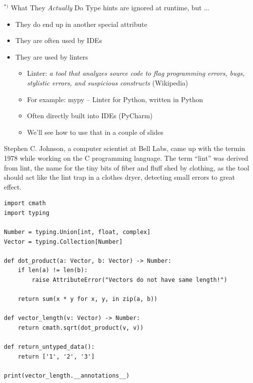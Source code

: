 \begin{frame}[fragile]{$^{*)}$ What They \emph{Actually} Do}
%
\vspace{-3pt}
Type hints are ignored at runtime, but ...
\begin{itemize}
\item They do end up in another special attribute 
\item They are often used by IDEs
\item They are used by linters
	\begin{itemize}
	\item Linter: \emph{a tool that analyzes source code to flag programming errors, bugs, stylistic errors, and suspicious constructs} (Wikipedia)
	\item For example: mypy -- Linter for Python, written in Python
	\item Often directly built into IDEs (\zB PyCharm)
	\item We'll see how to use that in a couple of slides
	\end{itemize}
\end{itemize}
%
\vspace{-3pt}
\begin{hintbox}
\footnotesize
Stephen C. Johnson, a computer scientist at Bell Labs, came up with the termin 1978 while working on the C programming language. The term \enquote{lint} was derived from lint, the name for the tiny bits of fiber and fluff shed by clothing, as the tool should act like the lint trap in a clothes dryer, detecting small errors to great effect.
\end{hintbox}
%
\end{frame}


\begin{frame}[fragile]
%
\begin{codebox}
\begin{verbatim}
import cmath
import typing

Number = typing.Union[int, float, complex]
Vector = typing.Collection[Number]

def dot_product(a: Vector, b: Vector) -> Number:
    if len(a) != len(b):
        raise AttributeError("Vectors do not have same length!")

    return sum(x * y for x, y, in zip(a, b))

def vector_length(v: Vector) -> Number:
    return cmath.sqrt(dot_product(v, v))

def return_untyped_data():
    return ['1', '2', '3']

print(vector_length.__annotations__)
\end{verbatim}
\end{codebox}
%
\end{frame}

